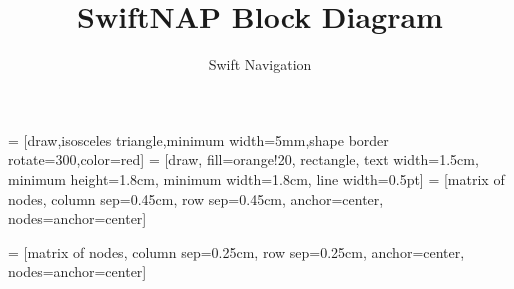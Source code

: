 \documentclass{article}
\title{SwiftNAP Block Diagram}
\author{Swift Navigation}
\begin{document}
 = [draw,isosceles triangle,minimum width=5mm,shape border rotate=300,color=red]
 = [draw, fill=orange!20, rectangle, text width=1.5cm, minimum height=1.8cm, minimum width=1.8cm, line width=0.5pt]
\def\filterSS{\node[block]{};
  \draw[line width=1pt] (-4mm,-2mm) to[in=220,out=40] (4mm,-2mm) 
                         (-4mm,0mm) to[in=220,out=40] (4mm,0mm) 
                         (-4mm,2mm) to[in=220,out=40] (4mm,2mm)
                        (-1mm,-1mm) to (1mm,1mm);}
 = [matrix of nodes,
      column sep=0.45cm,
      row sep=0.45cm,
      anchor=center,
      nodes={anchor=center}] 

 = [matrix of nodes,
      column sep=0.25cm,
      row sep=0.25cm,
      anchor=center,
      nodes={anchor=center}] 
\end{document}
